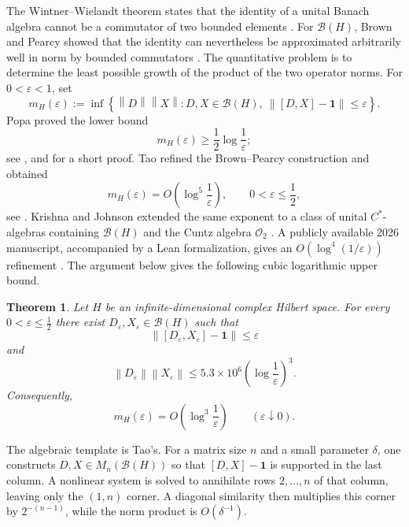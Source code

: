 \documentclass[11pt]{amsart}
\numberwithin{equation}{section}
\newtheorem{theorem}{Theorem}[section]
\theoremstyle{remark}
\newcommand{\one}{\mathbf 1}
\newcommand{\norm}[1]{\left\lVert #1\right\rVert}
\begin{document}
The Wintner--Wielandt theorem states that the identity of a unital Banach
algebra cannot be a commutator of two bounded elements
\cite{Wintner,Wielandt}.  For $\mathcal B(H)$, Brown and Pearcy showed that the
identity can nevertheless be approximated arbitrarily well in norm by bounded
commutators \cite{BrownPearcy}.  The quantitative problem is to determine the
least possible growth of the product of the two operator norms.  For
$0<\varepsilon<1$, set
\begin{equation}\label{eq:def-m}
 m_H(\varepsilon)
 :=\inf\left\{\norm D\norm X:
 D,X\in\mathcal B(H),\ \norm{[D,X]-\one}\leq\varepsilon\right\}.
\end{equation}
Popa proved the lower bound
\begin{equation}\label{eq:popa}
 m_H(\varepsilon)\geq\frac12\log\frac1\varepsilon;
\end{equation}
see \cite{Popa}, and \cite{Tao} for a short proof.  Tao refined the
Brown--Pearcy construction and obtained
\begin{equation}\label{eq:tao}
 m_H(\varepsilon)
 =O\!\left(\log^5\frac1\varepsilon\right),
 \qquad 0<\varepsilon\leq\frac12,
\end{equation}
see \cite{Tao}.  Krishna and Johnson extended the same exponent to a class of
unital $C^*$-algebras containing $\mathcal B(H)$ and the Cuntz algebra
$\mathcal O_2$ \cite{KrishnaJohnson}.  A publicly available 2026 manuscript, accompanied by a Lean formalization,
gives an $O(\log^4(1/\varepsilon))$ refinement
\cite{Bilich}.  The argument below gives the following cubic logarithmic
upper bound.

\begin{theorem}\label{thm:main}
Let $H$ be an infinite-dimensional complex Hilbert space.  For every
$0<\varepsilon\leq\frac12$ there exist $D_\varepsilon,X_\varepsilon\in
\mathcal B(H)$ such that
\begin{equation}\label{eq:main-error}
 \norm{[D_\varepsilon,X_\varepsilon]-\one}\leq\varepsilon
\end{equation}
and
\begin{equation}\label{eq:main-norm}
 \norm{D_\varepsilon}\norm{X_\varepsilon}
 \leq 5.3\times10^6
 \left(\log\frac1\varepsilon\right)^3.
\end{equation}
Consequently,
\[
 m_H(\varepsilon)
 =O\!\left(\log^3\frac1\varepsilon\right)
 \qquad(\varepsilon\downarrow0).
\]
\end{theorem}

The algebraic template is Tao's.  For a matrix size $n$ and a small parameter
$\delta$, one constructs $D,X\in M_n(\mathcal B(H))$ so that
$[D,X]-\one$ is supported in the last column.  A nonlinear system is solved to
annihilate rows $2,\ldots,n$ of that column, leaving only the $(1,n)$ corner.
A diagonal similarity then multiplies this corner by $2^{-(n-1)}$, while the
norm product is $O(\delta^{-1})$.
\end{document}
